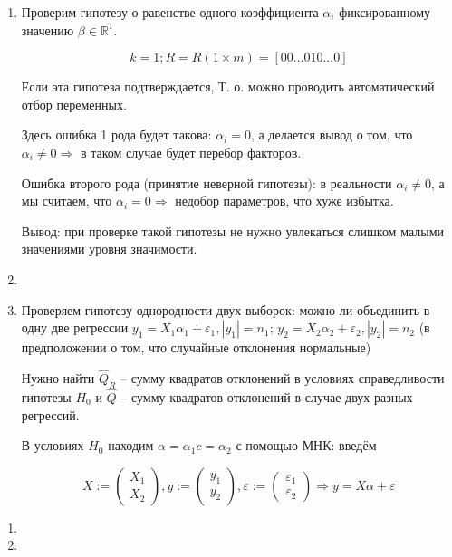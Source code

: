 \documentclass[main.tex]{subfiles}
\begin{document}
\begin{enumerate}[noitemsep]
    \item Проверим гипотезу о равенстве одного коэффициента $ \alpha_i $ фиксированному значению $ \beta \in \mathds{R}^1 $.

    $$ k=1; R = R(1\times m) = [0 0 ... 0 1 0 ... 0] $$

    Если эта гипотеза подтверждается,
    Т. о. можно проводить автоматический отбор переменных.

    Здесь ошибка 1 рода будет такова: $ \alpha_i = 0 $, а делается вывод о том, что $ \alpha_i \ne 0  \Rightarrow$ в таком случае будет перебор факторов.

    Ошибка второго рода (принятие неверной гипотезы): в реальности $ \alpha_i \ne 0 $, а мы считаем, что $ \alpha_i = 0 \Rightarrow $ недобор параметров, что хуже избытка.

    Вывод: при проверке такой гипотезы не нужно увлекаться слишком малыми значениями уровня значимости.
    \item %
    \item Проверяем гипотезу однородности двух выборок: можно ли объединить в одну две регрессии $ y_1 = X_1 \alpha_1 + \varepsilon_1, |y_1| = n_1 $; $ y_2 = X_2 \alpha_2 + \varepsilon_2, |y_2| = n_2 $ (в предположении о том, что случайные отклонения нормальные)

    Нужно найти $ \hat Q_R $ -- сумму квадратов отклонений в условиях справедливости гипотезы $ H_0 $ и $ \hat Q $ -- сумму квадратов отклонений в случае двух разных регрессий.

    В условиях $ H_0 $ находим $ \alpha = \alpha_1 c= \alpha_2 $ с помощью МНК: введём

    $$ X := \begin{pmatrix} X_1 \\ X_2 \end{pmatrix}, y := \begin{pmatrix} y_1 \\ y_2 \end{pmatrix}, \varepsilon := \begin{pmatrix} \varepsilon_1 \\ \varepsilon_2 \end{pmatrix} \Rightarrow y = X \alpha + \varepsilon $$

\end{enumerate}

\begin{enumerate}[noitemsep]
    \item
    \item
\end{enumerate}
\end{document}
